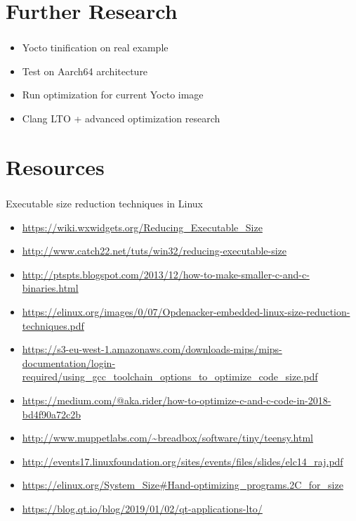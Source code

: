 \documentclass{beamer}
\begin{document}
\section{Further Research}

\begin{frame}
\frametitle{\secname}
\begin{itemize}
    \item Yocto tinification on real example
    \item Test on Aarch64 architecture
    \item Run optimization for current Yocto image
    \item Clang LTO + advanced optimization research
\end{itemize}
\end{frame}

\section{Resources}

\begin{frame}
\frametitle{\secname}
\tiny

Executable size reduction techniques in Linux

\begin{itemize}
\item \url{https://wiki.wxwidgets.org/Reducing_Executable_Size}
\item \url{http://www.catch22.net/tuts/win32/reducing-executable-size}
\item \url{http://ptspts.blogspot.com/2013/12/how-to-make-smaller-c-and-c-binaries.html}
\item \url{https://elinux.org/images/0/07/Opdenacker-embedded-linux-size-reduction-techniques.pdf}
\item \url{https://s3-eu-west-1.amazonaws.com/downloads-mips/mips-documentation/login-required/using_gcc_toolchain_options_to_optimize_code_size.pdf}
\item \url{https://medium.com/@aka.rider/how-to-optimize-c-and-c-code-in-2018-bd4f90a72c2b}
\item \url{http://www.muppetlabs.com/~breadbox/software/tiny/teensy.html}
\item \url{http://events17.linuxfoundation.org/sites/events/files/slides/elc14_raj.pdf}
\item \url{https://elinux.org/System_Size\#Hand-optimizing_programs.2C_for_size}
\item \url{https://blog.qt.io/blog/2019/01/02/qt-applications-lto/}
\end{itemize}
\end{frame}
\end{document}
